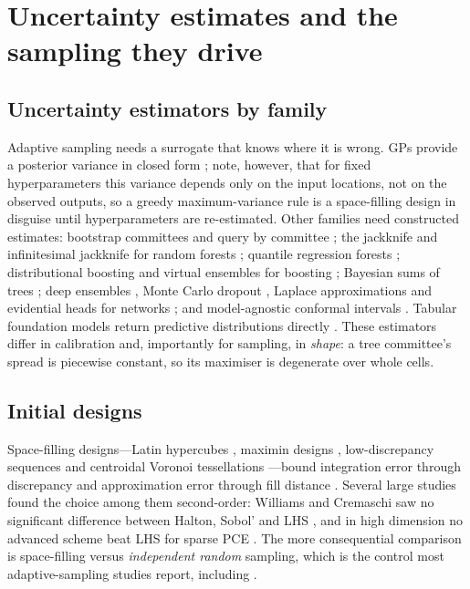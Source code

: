 \section{Uncertainty estimates and the sampling they drive}
\label{sec:uq}

\subsection{Uncertainty estimators by family}
Adaptive sampling needs a surrogate that knows where it is wrong. GPs provide a posterior variance in closed form
\cite{rasmussen2006gaussian}; note, however, that for fixed hyperparameters this variance depends only on the input
locations, not on the observed outputs, so a greedy maximum-variance rule is a space-filling design in disguise
until hyperparameters are re-estimated. Other families need constructed estimates: bootstrap committees and query by
committee \cite{seung1992query}; the jackknife and infinitesimal jackknife for random forests
\cite{wager2014confidence}; quantile regression forests \cite{meinshausen2006quantile}; distributional boosting
\cite{duan2020ngboost} and virtual ensembles for boosting \cite{malinin2021uncertainty}; Bayesian sums of trees
\cite{chipman2010bart}; deep ensembles \cite{lakshminarayanan2017simple}, Monte Carlo dropout \cite{gal2016dropout},
Laplace approximations \cite{daxberger2021laplace} and evidential heads \cite{amini2020deep,ulmer2023prior} for
networks \cite{abdar2021review}; and model-agnostic conformal intervals \cite{angelopoulos2023gentle}. Tabular
foundation models return predictive distributions directly \cite{hollmann2025tabpfn}. These estimators differ in
calibration and, importantly for sampling, in \emph{shape}: a tree committee's spread is piecewise constant, so its
maximiser is degenerate over whole cells.

\subsection{Initial designs}
Space-filling designs---Latin hypercubes \cite{mckay1979comparison}, maximin designs \cite{morris1995exploratory},
low-discrepancy sequences \cite{sobol1967distribution,niederreiter1992random} and centroidal Voronoi tessellations
\cite{du1999centroidal}---bound integration error through discrepancy and approximation error through fill distance
\cite{wendland2004scattered}. Several large studies found the choice among them second-order: Williams and Cremaschi saw
no significant difference between Halton, Sobol' and LHS \cite{williams2021novel}, and in high dimension no advanced
scheme beat LHS for sparse PCE \cite{luthen2021sparse}. The more consequential comparison is space-filling versus
\emph{independent random} sampling, which is the control most adaptive-sampling studies report, including \cite[App.~G]{poznanski2026towards}.

